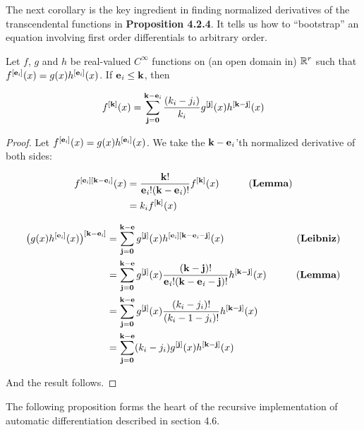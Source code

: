 \documentclass[11pt]{article}
\begin{document}
The next corollary is the key ingredient in finding normalized derivatives
of the transcendental functions in {\bf Proposition 4.2.4}.
It tells us how to ``bootstrap'' an equation involving first order differentials
to arbitrary order.

\begin{corollary}
Let $f$, $g$ and $h$ be real-valued $C^\infty$ functions on (an open domain in) $\mathbb{R}^r$
such that $f^{[{{\bf e}_{\it i}}]}(x)=g(x)h^{[{{\bf e}_{\it i}}]}(x)$. %
If ${{\bf e}_{\it i}}\leq{\bf k}$, then 

$$
    f^{[\bf k]}(x) = \sum_{\bf j=\bf 0}^{\bf k-{\bf e}_{\it i}} {(k_i-j_i)\over k_i} g^{[\bf j]}(x) h^{[\bf k-\bf j]}(x)
$$

\end{corollary}
\begin{proof}
Let $f^{[{{\bf e}_{\it i}}]}(x)=g(x)h^{[{{\bf e}_{\it i}}]}(x)$.
We take the $\bf k-{\bf e}_{\it i}$'th normalized derivative of both sides:

\begin{align*}
    f^{[{\bf e}_{\it i}][\bf k-{\bf e}_{\it i}]}(x) &= { \bf k! \over {\bf e}_{\it i}!(\bf k-{\bf e}_{\it i})! } f^{[\bf k]}(x)
        &\qquad\hbox{({\bf Lemma})} \\
                               &= k_i f^{[\bf k]}(x)
\end{align*}

\begin{align*}
    \bigl(g(x)h^{[{\bf e}_{\it i}]}(x)\bigr)^{[\bf k-{\bf e}_{\it i}]}
            &= \sum_{\bf j=\bf 0}^{\bf k-\bf e} g^{[\bf j]}(x) h^{[{\bf e}_{\it i}][\bf k-{\bf e}_{\it i}-\bf j]}(x) 
        &\qquad\hbox{({\bf Leibniz})} \\
            &= \sum_{\bf j=\bf 0}^{\bf k-\bf e}
                g^{[\bf j]}(x) {(\bf k-\bf j)!\over {\bf e}_{\it i}!(\bf k-{\bf e}_{\it i}-\bf j)!} h^{[\bf k-\bf j]}(x) 
        &\qquad\hbox{({\bf Lemma})} \\
            &= \sum_{\bf j=\bf 0}^{\bf k-\bf e}
                g^{[\bf j]}(x) {(k_i-j_i)!\over (k_i-1-j_i)!} h^{[\bf k-\bf j]}(x) \\
            &= \sum_{\bf j=\bf 0}^{\bf k-\bf e}
                (k_i-j_i) g^{[\bf j]}(x) h^{[\bf k-\bf j]}(x)
\end{align*}

And the result follows.

\end{proof}



The following proposition forms the heart of the recursive
implementation of automatic differentiation described in section 4.6.
\end{document}
